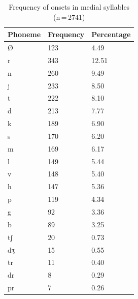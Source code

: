 %
\begin{table}[pth]\centering
\caption[Frequency of onsets in medial syllables]{Frequency of onsets in medial 
syllables (n\,=\,2741)}
\begin{tabu} to 0.5\linewidth{X X[c] X[c]}
\tableheaderfont\toprule
Phoneme
	& Frequency
	& Percentage
	\\
	
\toprule

Ø
	& 123
	& 4.49\pct
	\\

\midrule

r
	& 343
	& 12.51\pct
	\\

n
	& 260
	& 9.49\pct
	\\

j
	& 233
	& 8.50\pct
	\\

t
	& 222
	& 8.10\pct
	\\

d
	& 213
	& 7.77\pct
	\\

k
	& 189
	& 6.90\pct
	\\

s
	& 170
	& 6.20\pct
	\\

m
	& 169
	& 6.17\pct
	\\

l
	& 149
	& 5.44\pct
	\\

v
	& 148
	& 5.40\pct
	\\

h
	& 147
	& 5.36\pct
	\\

p
	& 119
	& 4.34\pct
	\\

g
	& 92
	& 3.36\pct
	\\

b
	& 89
	& 3.25\pct
	\\

tʃ
	& 20
	& 0.73\pct
	\\

dʒ
	& 15
	& 0.55\pct
	\\

tr
	& 11
	& 0.40\pct
	\\

dr
	& 8
	& 0.29\pct
	\\

pr
	& 7
	& 0.26\pct
	\\


\end{tabu}
\end{table}
